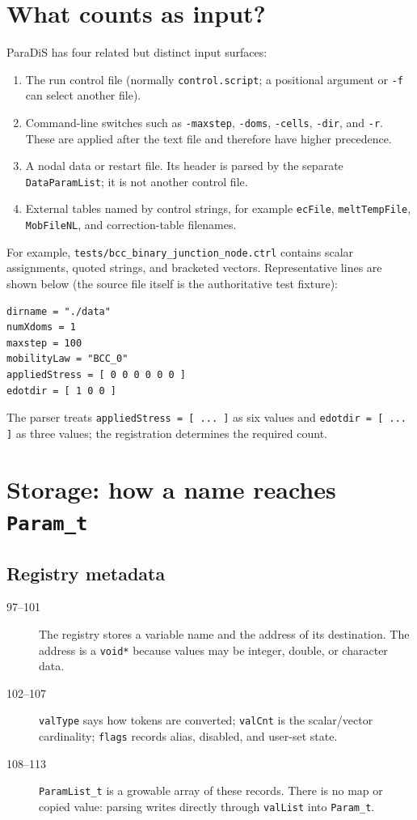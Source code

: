 \documentclass[11pt]{article}
\newcommand{\code}[1]{\texorpdfstring{\nolinkurl{#1}}{#1}}
\newcommand{\srcfile}[1]{\texorpdfstring{\nolinkurl{#1}}{#1}}
\begin{document}
\section{What counts as input?}
ParaDiS has four related but distinct input surfaces:
\begin{enumerate}
\item The run control file (normally \code{control.script}; a positional argument or \code{-f} can select another file).
\item Command-line switches such as \code{-maxstep}, \code{-doms}, \code{-cells}, \code{-dir}, and \code{-r}. These are applied after the text file and therefore have higher precedence.
\item A nodal data or restart file. Its header is parsed by the separate \code{DataParamList}; it is not another control file.
\item External tables named by control strings, for example \code{ecFile}, \code{meltTempFile}, \code{MobFileNL}, and correction-table filenames.
\end{enumerate}

For example, \srcfile{tests/bcc_binary_junction_node.ctrl} contains scalar assignments, quoted strings, and bracketed vectors. Representative lines are shown below (the source file itself is the authoritative test fixture):
\begin{verbatim}
dirname = "./data"
numXdoms = 1
maxstep = 100
mobilityLaw = "BCC_0"
appliedStress = [ 0 0 0 0 0 0 ]
edotdir = [ 1 0 0 ]
\end{verbatim}
The parser treats \code{appliedStress = [ ... ]} as six values and \code{edotdir = [ ... ]} as three values; the registration determines the required count.

\section{Storage: how a name reaches \code{Param_t}}
\subsection{Registry metadata}

\begin{description}
\item[97--101] The registry stores a variable name and the address of its destination. The address is a \code{void*} because values may be integer, double, or character data.
\item[102--107] \code{valType} says how tokens are converted; \code{valCnt} is the scalar/vector cardinality; \code{flags} records alias, disabled, and user-set state.
\item[108--113] \code{ParamList_t} is a growable array of these records. There is no map or copied value: parsing writes directly through \code{valList} into \code{Param_t}.
\end{description}
\end{document}
